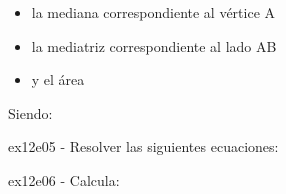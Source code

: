\documentclass[spanish, 11pt]{exam}
\begin{document}
\begin{questions}
\begin{itemize} \item la mediana correspondiente al vértice A \item la mediatriz correspondiente al lado AB \item y el área \end{itemize} Siendo:
        \begin{multicols}{1} 
        \end{multicols}
        \question ex12e05 - Resolver las siguientes ecuaciones:
        \begin{multicols}{1} 
        \end{multicols}
        \question ex12e06 - Calcula:
        \begin{multicols}{2} 

\end{multicols}
\end{questions}
\end{document}

